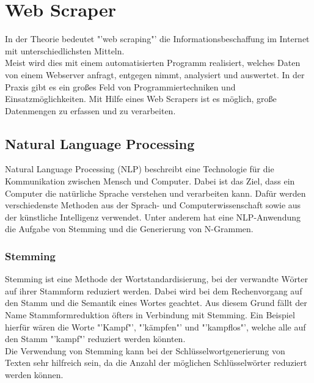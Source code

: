 \section{Web Scraper}
	In der Theorie bedeutet "'web scraping"' die Informationsbeschaffung im Internet mit unterschiedlichsten Mitteln. \cite{WebScraping}\\		
	Meist wird dies mit einem automatisierten Programm realisiert, welches Daten von einem Webserver anfragt, entgegen nimmt, analysiert und auswertet. 
	In der Praxis gibt es ein großes Feld von Programmiertechniken und Einsatzmöglichkeiten.
	Mit Hilfe eines Web Scrapers ist es möglich, große Datenmengen zu erfassen und zu verarbeiten.\cite{WebScraping}		

	\subsection{Natural Language Processing}
		Natural Language Processing (NLP) beschreibt eine Technologie für die Kommunikation zwischen Mensch und Computer. Dabei ist das Ziel, dass ein Computer die natürliche Sprache verstehen und verarbeiten kann. Dafür werden verschiedenste Methoden aus der Sprach- und Computerwissenschaft sowie aus der künstliche Intelligenz verwendet. Unter anderem hat eine NLP-Anwendung die Aufgabe von Stemming und die Generierung von N-Grammen.\cite{NLP} 
		
		\subsubsection{Stemming}
		Stemming ist eine Methode der Wortstandardisierung, bei der verwandte Wörter auf ihrer Stammform reduziert werden. Dabei wird bei dem Rechenvorgang auf den Stamm und die Semantik eines Wortes geachtet. Aus diesem Grund fällt der Name Stammformreduktion öfters in Verbindung mit Stemming.\cite{eldesouki2009stemming} Ein Beispiel hierfür wären die Worte "'Kampf"', "'kämpfen"' und "'kampflos"', welche alle auf den Stamm "'kampf"' reduziert werden könnten.\\ 
		Die Verwendung von Stemming kann bei der Schlüsselwortgenerierung von Texten sehr hilfreich sein, da die Anzahl der möglichen Schlüsselwörter reduziert werden können.
